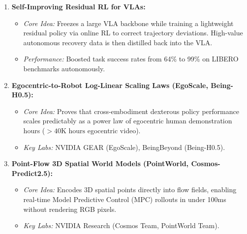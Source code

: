 \documentclass[11pt,a4paper]{article}
\begin{document}
\begin{enumerate}
    \item \textbf{Self-Improving Residual RL for VLAs:}
    \begin{itemize}
        \item \textit{Core Idea:} Freezes a large VLA backbone while training a lightweight residual policy via online RL to correct trajectory deviations. High-value autonomous recovery data is then distilled back into the VLA.
        \item \textit{Performance:} Boosted task success rates from 64\% to 99\% on LIBERO benchmarks autonomously.
    \end{itemize}

    \item \textbf{Egocentric-to-Robot Log-Linear Scaling Laws (EgoScale, Being-H0.5):}
    \begin{itemize}
        \item \textit{Core Idea:} Proves that cross-embodiment dexterous policy performance scales predictably as a power law of egocentric human demonstration hours ($>40\text{K hours}$ egocentric video).
        \item \textit{Key Labs:} NVIDIA GEAR (EgoScale), BeingBeyond (Being-H0.5).
    \end{itemize}

    \item \textbf{Point-Flow 3D Spatial World Models (PointWorld, Cosmos-Predict2.5):}
    \begin{itemize}
        \item \textit{Core Idea:} Encodes 3D spatial points directly into flow fields, enabling real-time Model Predictive Control (MPC) rollouts in under 100ms without rendering RGB pixels.
        \item \textit{Key Labs:} NVIDIA Research (Cosmos Team, PointWorld Team).
    \end{itemize}
\end{enumerate}
\end{document}
